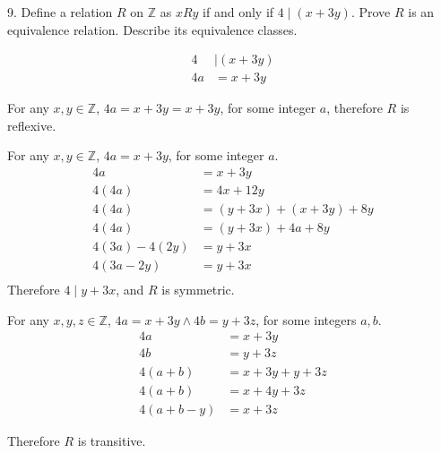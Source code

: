 \documentclass{article}
\begin{document}
\begin{exercise}{}{}{9. Define a relation $R$ on $\mathbb{Z}$ as $x R y$ if and
		only if $4 \mid(x+3 y)$. Prove $R$ is an equivalence relation. Describe its
		equivalence classes.}
	\begin{alist}
		\item
		\begin{align*}
			4  & \mid(x+3 y) \\
			4a & =x+3 y
		\end{align*}
		\item For any $x,y\in\mathbb{Z}$, $4a=x+3y=x+3y$, for some integer $a$,
		therefore $R$ is reflexive.
		\item For any $x,y\in\mathbb{Z}$, $4a=x+3y$, for some integer $a$.
		\begin{align*}
			4a          & =x+3y                 \\
			4(4a)       & =4x+12y               \\
			4(4a)       & =(y+3x) + (x+3y) + 8y \\
			4(4a)       & =(y+3x) + 4a + 8y     \\
			4(3a)-4(2y) & =y+3x                 \\
			4(3a-2y)    & =y+3x                 \\
		\end{align*}
		Therefore $4\mid y+3x$, and $R$ is symmetric.
		\item For any $x,y,z\in\mathbb{Z}$, $4a=x+3y \land 4b=y+3z$, for some integers $a, b$.
		\begin{align*}
			4a       & =x+3y      \\
			4b       & =y+3z      \\
			4(a+b)   & =x+3y+y+3z \\
			4(a+b)   & =x+4y+3z   \\
			4(a+b-y) & =x+3z
		\end{align*}
		\item Therefore $R$ is transitive.
	\end{alist}
\end{exercise}{}{}
\end{document}
